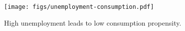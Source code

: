 \begin{figure}[t]
\centering
\texttt{[image: figs/unemployment-consumption.pdf]}
\caption{High unemployment leads to low consumption propensity.} \label{fig::explain-Phillips}
\end{figure}












